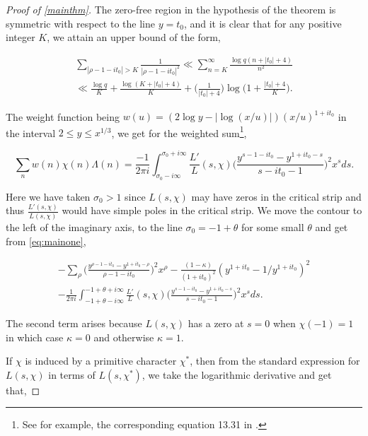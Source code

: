 \documentclass[letter,12pt]{article}
\theoremstyle{plain}
\theoremstyle{definition}
\theoremstyle{plain}
\begin{document}
\begin{proof}[Proof of \cref{mainthm}]
The zero-free region in the hypothesis of the theorem is symmetric with respect to the line $y=t_0$, and it is clear that for any positive integer $K$, we attain an upper bound of the form,

\begin{multline}\label{otherimp}
     \sum\limits_{|\rho-1-it_0|>K} \frac{1}{|\rho-1-it_0|^{2}} \ll \sum\limits_{n=K}^{\infty} \frac{\log q(n+|t_0|+4)}{n^{2}} \\ \ll \frac{\log q}{K}+\frac{\log(K+|t_0|+4)}{K}+ \Big(\frac{1}{|t_0|+4}\Big)\log\Big(1+ \frac{|t_0|+4}{K}\Big).
\end{multline}




The weight function being $w(u)= (2\log y -|\log(x/u)|)(x/u)^{1+it_0}$ in the interval $2\leq y \leq x^{1/3}$, we get for the weighted sum\footnote{See for example, the corresponding equation 13.31 in \cite{Mont}.},


\begin{equation}\label{eq:mainone}
\sum\limits_{n} w(n)\chi(n)\Lambda(n)= \frac{-1}{2\pi i} \int_{\sigma_0 -i\infty}^{\sigma_0 +i\infty} \frac{L'}{L}(s,\chi) \Bigg(\frac{y^{s-1-it_0}-y^{1+it_0-s}}{s-it_0-1} \Bigg)^{2} x^{s}ds.
\end{equation}


\noindent Here we have taken $\sigma_0 >1$ since $L(s,\chi)$ may have zeros in the critical strip and thus $\frac{L'(s,\chi)}{L(s,\chi)}$ would have simple poles in the critical strip. We move the contour to the left of the imaginary axis, to the line $\sigma_0 = -1+\theta$ for some small $\theta$ and get from \cref{eq:mainone},

\begin{multline}\label{eq:imp2}
    -\sum\limits_{\rho}\Big( \frac{y^{\rho -1-it_0}-y^{1+it_0-\rho}}{\rho -1-it_0}  \Big)^{2}x^{\rho} -\frac{(1-\kappa)}{(1+it_0)^{2}}(y^{1+it_0}- 1/y^{1+it_0})^{2} \\ -\frac{1}{2\pi i} \int_{-1+\theta -i\infty}^{-1+\theta +i\infty} \frac{L'}{L}(s,\chi) \Big( \frac{y^{s-1-it_0}-y^{1+it_0-s}}{s-it_0-1} \Big)^{2}x^{s}ds.
\end{multline}

\noindent The second term arises because $L(s,\chi)$ has a zero at $s=0$ when $\chi(-1)=1$ in which case $\kappa=0$ and otherwise $\kappa=1$.

If $\chi$ is induced by a primitive character $\chi^{*}$, then from the standard expression for $L(s,\chi)$ in terms of $L(s,\chi^{*})$, we take the logarithmic derivative and get that,


\end{proof}
\end{document}

